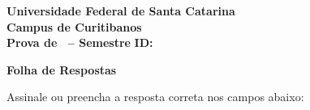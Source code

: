 \documentclass[10pt,a4paper]{article}
\makeatletter
\newcommand{\myCourse}{\@Course}
\newcommand{\mySemester}{\@Semester}
\newcommand{\myID}{\@ID}
\makeatother
\begin{document}
\thispagestyle{empty}
{\sf
\begin{center}
    \textbf{\LARGE Universidade Federal de Santa Catarina}\\[0.15cm]
    \textbf{\Large Campus de Curitibanos}\\[0.5cm]
    \textbf{\large Prova de \myCourse \ -- Semestre \mySemester} \hfill \textbf{ID: \myID}
\end{center}

\vspace{0.3cm}

\noindent{}

\vspace*{0.8cm}

\textbf{\Large Folha de Respostas}

\vspace{0.3cm}
Assinale ou preencha a resposta correta nos campos abaixo:
\vspace{0.5cm}

}

\newpage

\begin{enumerate}
\setlength{\itemsep}{1.5em}
\end{enumerate}
\end{document}

